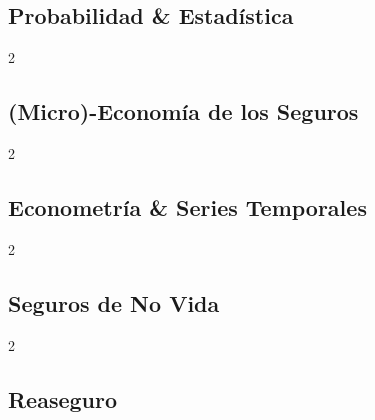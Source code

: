 \documentclass[a4paper]{article}
\theoremstyle{sansparenthese}
\begin{document}
\newpage
\begin{center}
    \section*{Probabilidad \& Estadística}
    \medskip
\end{center}

\begin{multicols}{2}


\end{multicols}

\newpage


\newpage

\begin{center}
    \section*{(Micro)-Economía de los Seguros}
    \medskip
\end{center}


\begin{multicols}{2}
	
\end{multicols}

\newpage
\begin{center}
	\section*{Econometría \& Series Temporales}
	\medskip
\end{center}


\begin{multicols}{2}
	
\end{multicols}

\newpage


\begin{center}
	\section*{Seguros de No Vida}
	\medskip
\end{center}

\begin{multicols}{2}	
	
\end{multicols}

\newpage

\begin{center}
	\section*{Reaseguro}
	\medskip
\end{center}
\end{document}
